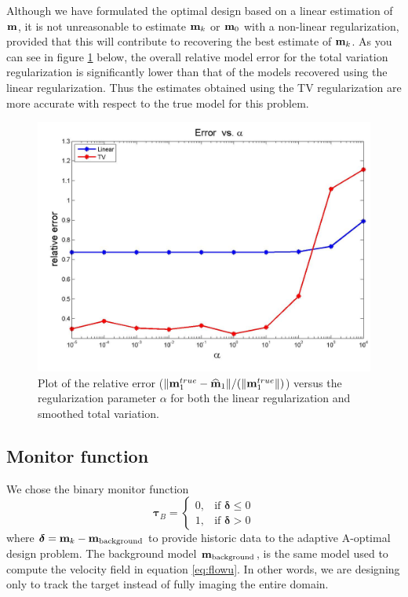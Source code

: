 \documentclass[11pt]{article}
\newcommand{\bfm}	{{\bf{m}}}
\newcommand{\bftau}      {{\boldsymbol \tau}}
\newcommand{\bfdelta}	 { { \boldsymbol \delta} }
\newcommand{\bfmhat}    {{\widehat{\bfm}}}
\begin{document}
Although we have formulated the optimal design based on a linear estimation of $\bfm$, it is not unreasonable to estimate $\bfm_k$ or $\bfm_0$ with a non-linear regularization, provided that this will contribute to recovering the best estimate of $\bfm_k$. As you can see in figure \ref{fig:erro1} below, the overall relative model error for the total variation regularization is significantly lower than that of the models recovered using the linear regularization. Thus the estimates obtained using the TV regularization are more accurate with respect to the true model for this problem. 
%
\begin{figure}[!h]
\begin{center}
\iwidth=180mm
\includegraphics[width=.75\iwidth]{figures/newFigs/exp2-error1}
\end{center}
\caption{Plot of the relative error ($\|\bfm_1^{true}-\bfmhat_1\|/(    \|\bfm^{true}_1\|)$) versus the regularization parameter $\alpha$ for both the linear regularization and smoothed total variation. }
	\label{fig:erro1}
\end{figure} 









\subsection{Monitor function}
We chose the binary monitor function 
\begin{equation*}
\bftau_{B} =  
\begin{cases}
0, & \text{if } \bfdelta \leq 0\\
1, & \text{if } \bfdelta > 0
\end{cases}
\end{equation*}
where $\bfdelta = \bfm_{k} -\bfm_{\text{background}} $ to provide historic data to the adaptive A-optimal design problem. The background model $\bfm_{\text{background}} $, is the same model used to compute the velocity field in equation \eqref{eq:flowu}. In other words, we are designing only to track the target instead of fully imaging the entire domain. 
\end{document}
